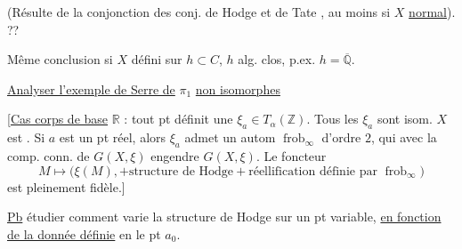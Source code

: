 (Résulte de la conjonction des conj. de
Hodge et de Tate , au moins si $X$
\uline{normal}). \uline{} ??

Même conclusion si $X$ défini sur $h\subset C$, $h$ alg.
clos, p.ex. $h=\overline{\mathbb Q}$.

\uline{Analyser l'exemple de Serre de} $\pi_1$ \uline{non
isomorphes}

[\uline{Cas corps de base} $\mathbb R$ : tout pt  définit
une $\xi_a\in T_\alpha(\mathbb Z)$. Tous les $\xi_a$ sont isom.
  $X$ est .
Si $a$ est un pt réel, alors $\xi_a$ admet
un autom $\operatorname{frob}_\infty$ d'ordre $2$, qui
avec la comp. conn. de $G(X,\xi)$ engendre
$G(X,\xi)$. Le foncteur
\[
M\longmapsto\bigl(\xi(M),+\text{structure de Hodge}
+\text{réellification définie par }\operatorname{frob}_\infty\bigr)
\]
est pleinement fidèle.]


\uline{Pb} étudier comment varie la structure
de Hodge sur un pt  variable, \uline{en fonction de
la donnée définie} en le pt $a_0$.
